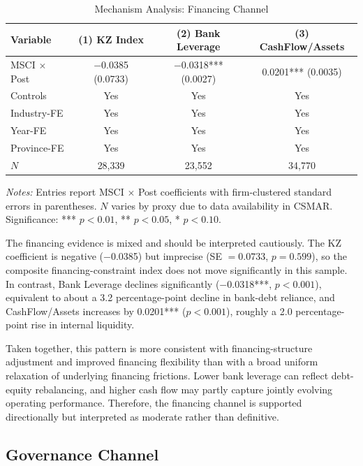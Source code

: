 \begin{table}[htbp]
\centering
\caption{Mechanism Analysis: Financing Channel}
\label{tab:financing_channel}
\small
\begin{tabular}{lccc}
\toprule
\textbf{Variable} & \textbf{(1) KZ Index} & \textbf{(2) Bank Leverage} & \textbf{(3) CashFlow/Assets} \\
\midrule
MSCI $\times$ Post & $-$0.0385 (0.0733) & $-$0.0318*** (0.0027) & 0.0201*** (0.0035) \\
Controls & Yes & Yes & Yes \\
Industry-FE & Yes & Yes & Yes \\
Year-FE & Yes & Yes & Yes \\
Province-FE & Yes & Yes & Yes \\
$N$ & 28,339 & 23,552 & 34,770 \\
\bottomrule
\end{tabular}
\begin{tablenotes}
\small
\item \textit{Notes:} Entries report MSCI $\times$ Post coefficients with firm-clustered standard errors in parentheses. $N$ varies by proxy due to data availability in CSMAR. Significance: *** $p < 0.01$, ** $p < 0.05$, * $p < 0.10$.
\end{tablenotes}
\end{table}

The financing evidence is mixed and should be interpreted cautiously. The KZ coefficient is negative ($-$0.0385) but imprecise (SE $=0.0733$, $p = 0.599$), so the composite financing-constraint index does not move significantly in this sample. In contrast, Bank Leverage declines significantly ($-$0.0318***, $p < 0.001$), equivalent to about a 3.2 percentage-point decline in bank-debt reliance, and CashFlow/Assets increases by 0.0201*** ($p < 0.001$), roughly a 2.0 percentage-point rise in internal liquidity.

Taken together, this pattern is more consistent with financing-structure adjustment and improved financing flexibility than with a broad uniform relaxation of underlying financing frictions. Lower bank leverage can reflect debt-equity rebalancing, and higher cash flow may partly capture jointly evolving operating performance. Therefore, the financing channel is supported directionally but interpreted as moderate rather than definitive.

\subsection{Governance Channel}

